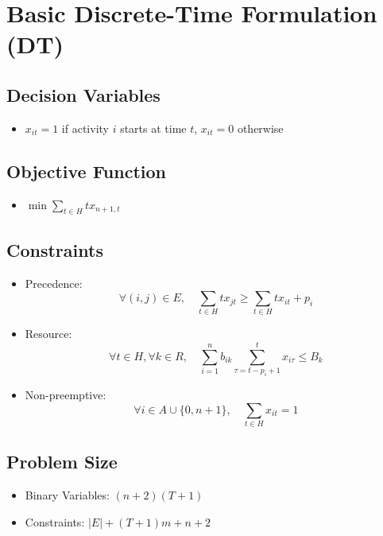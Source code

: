\documentclass{paper}
\begin{document}
	\section{Basic Discrete-Time Formulation (DT)}
	   \subsection{Decision Variables}
	      \begin{itemize}
		     \item $x_{it}=1$ if activity $i$ starts at time $t$, $x_{it}=0$ otherwise
	      \end{itemize}
	   \subsection{Objective Function}
	      \begin{itemize}
		     \item $\min\sum _{t\in H}tx_{n+1,t}$ 
	      \end{itemize}
	   \subsection{Constraints}
	      \begin{itemize}
		     \item Precedence:
		    \begin{equation}
			 \forall (i,j) \in E, \quad \sum _{t\in H}tx_{jt}\geq \sum _{t\in H}tx_{it}+p_i
			\end{equation}
			\item Resource:
			\begin{equation}
			\forall t \in H, \forall k \in R, \quad \sum _{i=1}^{n}b_{ik}\sum _{\tau =t-p_i+1}^{t}x_{i\tau }\leq B_k
		    \end{equation}
			\item Non-preemptive:
			\begin{equation}
			\forall i \in A\cup \{0,n+1\}, \quad \sum _{t\in H}x_{it}=1
		    \end{equation}
		  \end{itemize}
	   \subsection{Problem Size}
	      \begin{itemize}
            \item Binary Variables: $(n+2)(T+1)$ 
			\item Constraints: $\left\lvert E \right\rvert + (T+1)m+n+2$ 
		  \end{itemize}
	
\end{document}
